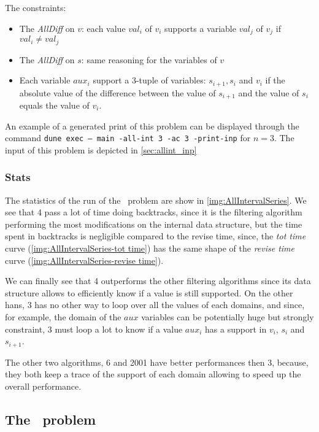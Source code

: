 \documentclass{rapport}
\begin{document}
The constraints:
\begin{itemize}
  \item The \textit{AllDiff} on $v$: each value $val_i$ of $v_i$ supports a variable $val_j$ of $v_j$ if $val_i \neq val_j$
  \item The \textit{AllDiff} on $s$: same reasoning for the variables of $v$
  \item Each variable $aux_i$ support a $3$-tuple of variables: $s_{i+1}, s_i$ and $v_i$ if the absolute value of the difference between the value of $s_{i+1}$ and the value of $s_i$ equals the value of $v_i$.
\end{itemize}

An example of a generated print of this problem can be displayed through the command \texttt{dune exec -- main -all-int 3 -ac 3 -print-inp} for $n = 3$. The input of this problem is depicted in \cref{sec:allint_inp}


\subsubsection{Stats}


The statistics of the run of the \allint\ problem are show in \cref{img:AllIntervalSeries}. We see that \ac{4} pass a lot of time doing backtracks, since it is the filtering algorithm performing the most modifications on the internal data structure, but the time spent in backtracks is negligible compared to the revise time, since, the \textit{tot time} curve (\cref{img:AllIntervalSeries-tot time}) has the same shape of the \textit{revise time} curve (\cref{img:AllIntervalSeries-revise time}).

We can finally see that \ac{4} outperforms the other filtering algorithms since its data structure allows to efficiently know if a value is still supported. On the other hans, \ac{3} has no other way to loop over all the values of each domains, and since, for example, the domain of the $aux$ variables can be potentially huge but strongly constraint, \ac{3} must loop a lot to know if a value $aux_i$ has a support in $v_i$, $s_i$ and $s_{i+1}$.

The other two algorithms, \ac{6} and \ac{2001} have better performances then \ac{3}, because, they both keep a trace of the support of each domain allowing to speed up the overall performance.


\subsection{The \queens\ problem}
\end{document}
